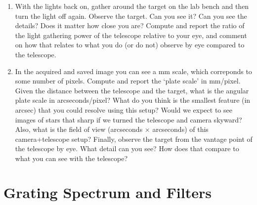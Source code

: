 \begin{enumerate}
	\item With the lights back on, gather around the target on the lab bench and then
	turn the light off again. Observe the target. Can you see it? Can you see the details? Does
	it matter how close you are? Compute and report the ratio of the light gathering power of
	the telescope relative to your eye, and comment on how that relates to what you do (or do
	not) observe by eye compared to the telescope.
	
	\item In the acquired and saved image you can see a mm scale, which correponds to some number
	of pixels. Compute and report the ‘plate scale’ in mm/pixel. Given the distance between the
	telescope and the target, what is the angular plate scale in arcseconds/pixel? What do you
	think is the smallest feature (in arcsec) that you could resolve using this setup? Would we
	expect to see images of stars that sharp if we turned the telescope and camera skyward?
	Also, what is the field of view (arcseconds $\times$
	arcseconds) of this camera+telescope setup? Finally, observe the target from the vantage
	point of the telescope by eye. What detail can you see? How does that compare to what
	you can see with the telescope?
\end{enumerate}

\section{Grating Spectrum and Filters}\label{sot:sec:grating}

